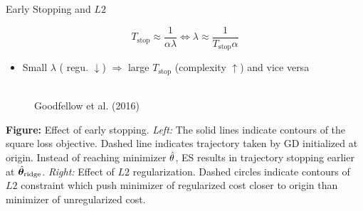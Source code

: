 \documentclass[11pt,compress,t,notes=noshow, xcolor=table]{beamer}
\begin{document}
\begin{vbframe}{Early Stopping and $L2$ }
\begin{itemize}
 \end{itemize}
\begin{equation*}
T_{\text{stop}} \approx \frac{1}{\alpha \lambda} 
\Leftrightarrow \lambda \approx \frac{1}{T_{\text{stop}} \alpha}
\end{equation*}
  \begin{itemize}
    \item Small $\lambda$ ( regu. $\downarrow$) $\Rightarrow$ large $T_{\text{stop}}$ (complexity $\uparrow$) and vice versa
  \end{itemize}
\framebreak
  \begin{figure}
    \centering
      \tiny{\\Goodfellow et al. (2016)\\}
  \end{figure}
  
\footnotesize 
\textbf{Figure:} Effect of early stopping. \textit{Left:} The solid lines indicate contours of the square loss objective. Dashed line indicates trajectory taken by GD initialized at origin. Instead of reaching minimizer $\hat{\theta}$, ES results in trajectory stopping earlier at $\hat{\bm{\theta}}_{\text{ridge}}$. \textit{Right:} Effect of $L2$ regularization. Dashed circles indicate contours of $L2$ constraint which push minimizer of regularized cost closer to origin than minimizer of unregularized cost.
\end{vbframe}
\end{document}
